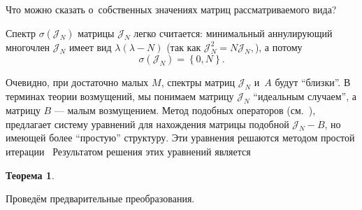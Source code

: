 \documentclass[14pt,a4paper]{extarticle}
\newtheorem{thm}{Теорема}
\theoremstyle{definition}
\begin{document}
Что можно сказать о~собственных значениях матриц рассматриваемого вида?

Спектр \( \sigma\left( \mathcal{J}_N \right) \)
 матрицы \( \mathcal{J}_N \) легко считается: минимальный аннулирующий
 многочлен \( \mathcal{J}_N \) имеет вид \( \lambda(\lambda - N) \) (так как \(
 \mathcal{J}_N^2 = N \mathcal{J}_N, \)), а потому
 \[ \sigma\left( \mathcal{J}_N \right) = \left\{ 0,N \right\}. \]

Очевидно, при достаточно малых \( M \),
спектры матриц \( \mathcal{J}_N \) и~\( A \) будут ``близки''.
В терминах теории возмущений, мы понимаем матрицу \( \mathcal{J}_N \)
``идеальным случаем'', а матрицу \( B \) --- малым возмущением.
Метод подобных операторов (см.~\cite{baskakov1986theorem,baskakov1987theorem,baskakov1994spectral,baskakov2002splitting}),
предлагает систему уравнений для нахождения матрицы подобной \( \mathcal{J}_N -
B \), но имеющей более ``простую'' структуру. Эти уравнения решаются методом
простой итерации~\cite{baskakov1986theorem,baskakov1987theorem,baskakov1994spectral,baskakov2002splitting}
Результатом решения этих уравнений
является
\begin{thm}\label{nk:thm:almost-all-ones}
  
\end{thm}

Провед\"ем предварительные преобразования.
\end{document}
